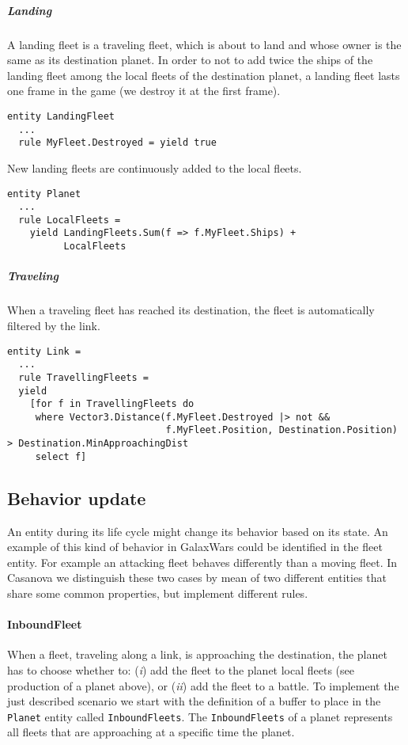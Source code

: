 \subparagraph{Landing}
A landing fleet is a traveling fleet, which is about to land and whose owner is the same as its destination planet. In order to not to add twice the ships of the landing fleet among the local fleets of the destination planet, a landing fleet lasts one frame in the game (we destroy it at the first frame).
\begin{lstlisting}
entity LandingFleet
  ...
  rule MyFleet.Destroyed = yield true
\end{lstlisting}

New landing fleets are continuously added to the local fleets.
\begin{lstlisting}
entity Planet
  ...
  rule LocalFleets =
    yield LandingFleets.Sum(f => f.MyFleet.Ships) +
          LocalFleets
\end{lstlisting}

\subparagraph{Traveling}
When a traveling fleet has reached its destination, the fleet is automatically filtered by the link. 
\begin{lstlisting}
entity Link =
  ...
  rule TravellingFleets =
  yield 
    [for f in TravellingFleets do
     where Vector3.Distance(f.MyFleet.Destroyed |> not &&
                            f.MyFleet.Position, Destination.Position) > Destination.MinApproachingDist
     select f]
\end{lstlisting}

\subsection{Behavior update}
An entity during its life cycle might change its behavior based on its state. An example of this kind of behavior in GalaxWars could be identified in the fleet entity. For example an attacking fleet behaves differently than a moving fleet. In Casanova we distinguish these two cases by mean of two different entities that share some common properties, but implement different rules.

\paragraph{InboundFleet}
When a fleet, traveling along a link, is approaching the destination, the planet has to choose whether to: (\textit{i}) add the fleet to the planet local fleets (see production of a planet above), or (\textit{ii}) add the fleet to a battle. To implement the just described scenario we start with the definition of a buffer to place in the \texttt{Planet} entity called \texttt{InboundFleets}. The \texttt{InboundFleets} of a planet represents all fleets that are approaching at a specific time the planet. 

